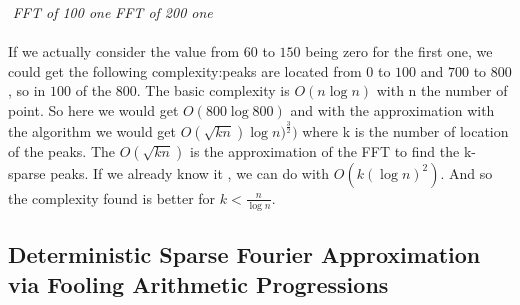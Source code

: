 \documentclass{article}
\begin{document}
${}$ \hspace{9em} \textit{FFT of 100 one} \hspace{18em} \textit{FFT of 200 one}
\\
\\
If we actually consider the value from $60$ to $150$ being zero for the first one, we could get the following complexity:peaks are located from $0$ to $100$ and $700$ to $800$ , so in $100$ of the $800$. The basic complexity is $O(n\log n)$ with n the number of point. So here we would get $O(800\log 800)$ and with the approximation with the algorithm we would get $O(\sqrt{kn} )\log n)^{\frac{3}{2}})$ where k is the number of location of the peaks. The $O(\sqrt{kn})$ is the approximation of the FFT to find the k-sparse peaks. If we already know it , we can do with $O(k (\log n)^2)$. And so the complexity found is better for $ k < \frac{n}{\log n} $.

\subsection{Deterministic Sparse Fourier Approximation via Fooling Arithmetic Progressions}
\end{document}
